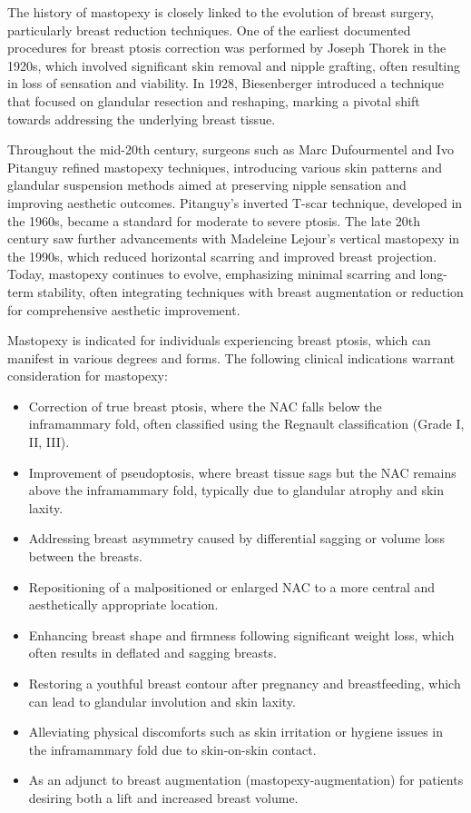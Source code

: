 The history of mastopexy is closely linked to the evolution of breast surgery, particularly breast reduction techniques. One of the earliest documented procedures for breast ptosis correction was performed by Joseph Thorek in the 1920s, which involved significant skin removal and nipple grafting, often resulting in loss of sensation and viability. In 1928, Biesenberger introduced a technique that focused on glandular resection and reshaping, marking a pivotal shift towards addressing the underlying breast tissue.

Throughout the mid-20th century, surgeons such as Marc Dufourmentel and Ivo Pitanguy refined mastopexy techniques, introducing various skin patterns and glandular suspension methods aimed at preserving nipple sensation and improving aesthetic outcomes. Pitanguy's inverted T-scar technique, developed in the 1960s, became a standard for moderate to severe ptosis. The late 20th century saw further advancements with Madeleine Lejour's vertical mastopexy in the 1990s, which reduced horizontal scarring and improved breast projection. Today, mastopexy continues to evolve, emphasizing minimal scarring and long-term stability, often integrating techniques with breast augmentation or reduction for comprehensive aesthetic improvement.

Mastopexy is indicated for individuals experiencing breast ptosis, which can manifest in various degrees and forms. The following clinical indications warrant consideration for mastopexy:

\begin{itemize}
  \item Correction of true breast ptosis, where the NAC falls below the inframammary fold, often classified using the Regnault classification (Grade I, II, III).
  \item Improvement of pseudoptosis, where breast tissue sags but the NAC remains above the inframammary fold, typically due to glandular atrophy and skin laxity.
  \item Addressing breast asymmetry caused by differential sagging or volume loss between the breasts.
  \item Repositioning of a malpositioned or enlarged NAC to a more central and aesthetically appropriate location.
  \item Enhancing breast shape and firmness following significant weight loss, which often results in deflated and sagging breasts.
  \item Restoring a youthful breast contour after pregnancy and breastfeeding, which can lead to glandular involution and skin laxity.
  \item Alleviating physical discomforts such as skin irritation or hygiene issues in the inframammary fold due to skin-on-skin contact.
  \item As an adjunct to breast augmentation (mastopexy-augmentation) for patients desiring both a lift and increased breast volume.
\end{itemize}


